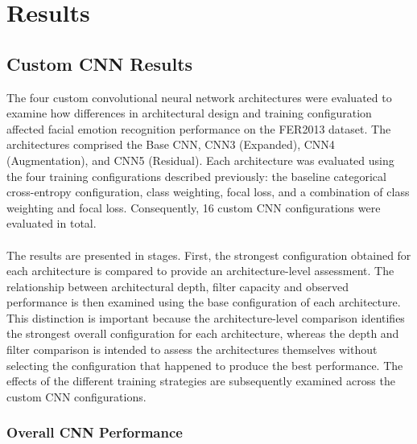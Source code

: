 \documentclass[12pt, a4paper]{report}
\let\oldsection\section
\renewcommand{\section}{%
    \Needspace{6\baselineskip}%
    \oldsection
}
\let\oldsubsection\subsection
\renewcommand{\subsection}{%
    \Needspace{6\baselineskip}%
    \oldsubsection
}
\begin{document}
	\chapter{Results}
		
		\section{Custom CNN Results}
			
			The four custom convolutional neural network architectures were evaluated to examine how differences in architectural design and training configuration affected facial emotion recognition performance on the FER2013 dataset. The architectures comprised the Base CNN, CNN3 (Expanded), CNN4 (Augmentation), and CNN5 (Residual). Each architecture was evaluated using the four training configurations described previously: the baseline categorical cross-entropy configuration, class weighting, focal loss, and a combination of class weighting and focal loss. Consequently, 16 custom CNN configurations were evaluated in total.\\\\
			The results are presented in stages. First, the strongest configuration obtained for each architecture is compared to provide an architecture-level assessment. The relationship between architectural depth, filter capacity and observed performance is then examined using the base configuration of each architecture. This distinction is important because the architecture-level comparison identifies the strongest overall configuration for each architecture, whereas the depth and filter comparison is intended to assess the architectures themselves without selecting the configuration that happened to produce the best performance. The effects of the different training strategies are subsequently examined across the custom CNN configurations.
			
			\subsection{Overall CNN Performance}
				
\end{document}
